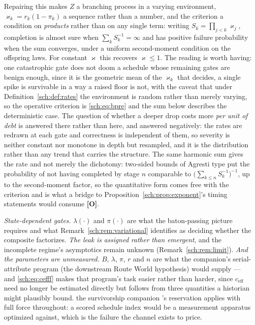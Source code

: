 \documentclass[11pt]{article}
\theoremstyle{plain}
\theoremstyle{definition}
\theoremstyle{remark}
\begin{document}
Repairing this makes $Z$ a branching process in a varying environment,
$\varkappa_k=r_k(1-\pi_k)$ a sequence rather than a number, and the criterion a
condition on \emph{products} rather than on any single term: writing
$S_k=\prod_{j<k}\varkappa_j$, completion is almost sure when
$\sum_k S_k^{-1}=\infty$ and has positive failure probability when the
sum converges, under a uniform second-moment condition on the offspring
laws. For constant $\varkappa$ this recovers $\varkappa\le1$. The reading is worth
having: one catastrophic gate does not doom a schedule whose remaining
gates are benign enough, since it is the geometric mean of the $\varkappa_k$
that decides, a single spike is survivable in a way a raised floor is
not, with the caveat that under Definition~\ref{sch:def:rates} the
environment is random rather than merely varying, so the operative
criterion is \eqref{sch:eq:bpre} and the sum below describes the
deterministic case. The question of whether a deeper drop costs more
\emph{per unit of debt} is answered there rather than here, and answered
negatively: the rates are redrawn at each gate and correctness is
independent of them, so severity is neither constant nor monotone in
depth but resampled, and it is the distribution rather than any trend
that carries the structure. The same harmonic sum gives the rate and not
merely the dichotomy:
two-sided bounds of Agresti type put the probability of not having
completed by stage $n$ comparable to $\bigl(\sum_{k\le n}S_k^{-1}
\bigr)^{-1}$, up to the second-moment factor, so the quantitative form
comes free with the criterion and is what a bridge to
Proposition~\ref{sch:prop:exponent}'s timing statements would consume
\textbf{[O]}.

\emph{State-dependent gates.} $\lambda(\cdot)$ and $\pi(\cdot)$ are what
the baton-passing picture requires and what
Remark~\ref{sch:rem:variational} identifies as deciding whether the
composite factorizes. \emph{The leak is assigned rather than emergent}, and the incomplete
regime's asymptotics remain unknown (Remark~\ref{sch:rem:limit}). \emph{And the parameters are unmeasured.} $B$, $\lambda$, $\pi$, $r$ and
$n$ are what the companion's serial-attribute program
(the downstream Route World hypothesis) would supply --- and \eqref{sch:eq:cefff}
makes that program's task easier rather than harder, since
$c_{\mathrm{eff}}$ need no longer be estimated directly but follows from
three quantities a historian might plausibly bound.
the survivorship companion \cite{SurvA}'s reservation applies with full force
throughout: a scored schedule index would be a measurement apparatus
optimized against, which is the failure the channel exists to price.
\end{document}
